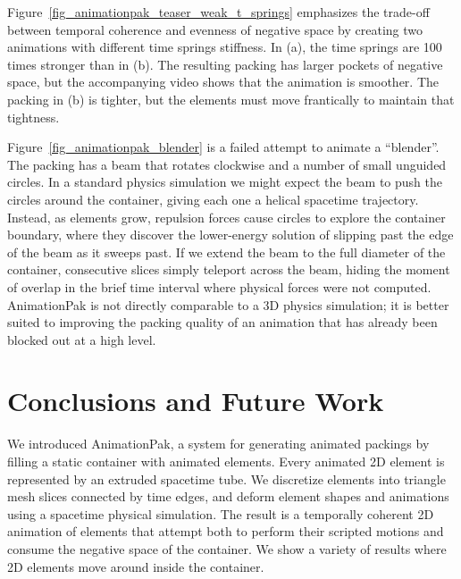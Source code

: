 Figure~\ref{fig_animationpak_teaser_weak_t_springs} emphasizes the trade-off between
temporal coherence and evenness of negative space by creating two animations
with different time springs stiffness.  In (a), the time springs
are 100 times stronger than in (b).  The resulting packing has larger
pockets of negative space, but the accompanying video shows that the
animation is smoother.  The packing in (b) is tighter, but the elements
must move frantically to maintain that tightness.


Figure~\ref{fig_animationpak_blender} is a failed attempt to animate a ``blender''.
The packing has a beam that rotates clockwise
and a number of small unguided circles.  
In a standard physics simulation we might expect the beam to push the 
circles around the container, giving each one a helical spacetime 
trajectory.
Instead, as elements grow, repulsion forces cause circles to explore the 
container boundary, where they discover the lower-energy solution of 
slipping past the edge of the beam as it sweeps past.
If we extend the beam to the full diameter of the container,
consecutive slices simply teleport across the beam, hiding the moment of
overlap in the brief time interval where physical forces were not computed.
AnimationPak is not directly comparable to a
3D physics simulation; it is better suited to improving the
packing quality of an animation that has already been blocked out at a 
high level.


\section{Conclusions and Future Work}
\label{animationpak_conclusions}

We introduced AnimationPak, a system for 
generating animated packings by filling a static container with animated
elements.  Every animated 2D element is represented by an extruded 
spacetime tube.
We discretize elements into triangle mesh slices connected by time edges,
and deform element shapes and animations using a spacetime physical
simulation.  The result is a temporally coherent 2D animation of elements
that attempt both to perform their scripted motions and consume the negative
space of the container.
We show a variety of results where
2D elements move around inside the container.


